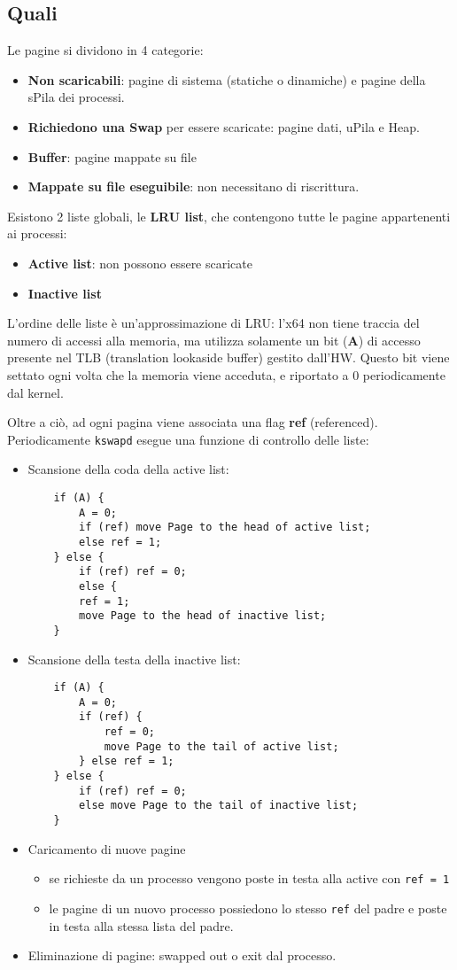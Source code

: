 \documentclass[12pt, a4paper]{report}
\begin{document}
\subsection{Quali}
Le pagine si dividono in 4 categorie:
\begin{itemize}
	\item \textbf{Non scaricabili}: pagine di sistema (statiche o dinamiche) e
		pagine della sPila dei processi.
	\item \textbf{Richiedono una Swap} per essere scaricate: pagine dati, uPila
		e Heap.
	\item \textbf{Buffer}: pagine mappate su file
	\item \textbf{Mappate su file eseguibile}: non necessitano di riscrittura.
\end{itemize}
Esistono 2 liste globali, le \textbf{LRU list}, che contengono tutte le pagine
appartenenti ai processi:
\begin{itemize}
	\item \textbf{Active list}: non possono essere scaricate
	\item \textbf{Inactive list}
\end{itemize}
L'ordine delle liste è un'approssimazione di LRU: l'x64 non tiene traccia del
numero di accessi alla memoria, ma utilizza solamente un bit (\textbf{A}) di
accesso presente nel TLB (translation lookaside buffer) gestito dall'HW. Questo
bit viene settato ogni volta che la memoria viene acceduta, e riportato a 0
periodicamente dal kernel.

Oltre a ciò, ad ogni pagina viene associata una flag \textbf{ref} (referenced).
Periodicamente \texttt{kswapd} esegue una funzione di controllo delle liste:
\begin{itemize}
	\item Scansione della coda della active list:
        \begin{verbatim}
    if (A) {
        A = 0;
        if (ref) move Page to the head of active list;
        else ref = 1;
    } else {
        if (ref) ref = 0;
        else {
	    ref = 1;
	    move Page to the head of inactive list;
    }
        \end{verbatim}
	\item Scansione della testa della inactive list:
        \begin{verbatim}
    if (A) {
        A = 0;
        if (ref) {
            ref = 0;
            move Page to the tail of active list;
        } else ref = 1;
    } else {
        if (ref) ref = 0;
        else move Page to the tail of inactive list;
    }
        \end{verbatim}
	\item Caricamento di nuove pagine
		\begin{itemize}
			\item se richieste da un processo vengono poste in testa alla active
				con \texttt{ref = 1}
			\item le pagine di un nuovo processo possiedono lo stesso
				\texttt{ref} del padre e poste in testa alla stessa lista del
				padre.
		\end{itemize}
	\item Eliminazione di pagine: swapped out o exit dal processo.
\end{itemize}
\end{document}
